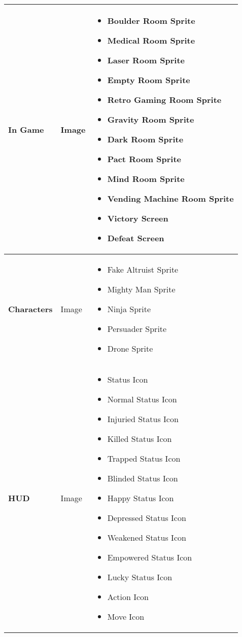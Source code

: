 \pagebreak
\begin{tabular}{|m{3cm}|m{3cm}|m{7cm}|}
	\hline
	\textbf{In Game}& Image & 
	\begin{itemize}
     	\item Boulder Room Sprite
     	\item Medical Room Sprite
     	\item Laser Room Sprite
     	\item Empty Room Sprite
     	\item Retro Gaming Room Sprite
     	\item Gravity Room Sprite
     	\item Dark Room Sprite
     	\item Pact Room Sprite
     	\item Mind Room Sprite
     	\item Vending Machine Room Sprite
     	\item Victory Screen
     	\item Defeat Screen
     \end{itemize}
     \\
     \hline
     \textbf{Characters}& Image & 
     \begin{itemize}
     	\item Fake Altruist Sprite
     	\item Mighty Man Sprite
     	\item Ninja Sprite
     	\item Persuader Sprite
     	\item Drone Sprite
     \end{itemize}
     \\
     \hline
     \textbf{HUD}& Image & 
     \begin{itemize}
     	\item Status Icon
     	\item Normal Status Icon
     	\item Injuried Status Icon
     	\item Killed Status Icon
     	\item Trapped Status Icon
     	\item Blinded Status Icon
     	\item Happy Status Icon
     	\item Depressed Status Icon
     	\item Weakened Status Icon
     	\item Empowered Status Icon
     	\item Lucky Status Icon
     	\item Action Icon
     	\item Move Icon
    \end{itemize}
	\\
	\end{tabular}
	
